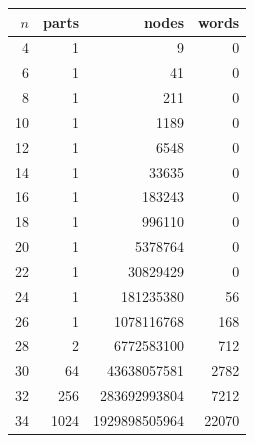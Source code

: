 \begin{tabular}{rrrr}
\toprule
$n$ & parts & nodes & words \\
\midrule
4 & 1 & \num{9} & \num{0} \\
6 & 1 & \num{41} & \num{0} \\
8 & 1 & \num{211} & \num{0} \\
10 & 1 & \num{1189} & \num{0} \\
12 & 1 & \num{6548} & \num{0} \\
14 & 1 & \num{33635} & \num{0} \\
16 & 1 & \num{183243} & \num{0} \\
18 & 1 & \num{996110} & \num{0} \\
20 & 1 & \num{5378764} & \num{0} \\
22 & 1 & \num{30829429} & \num{0} \\
24 & 1 & \num{181235380} & \num{56} \\
26 & 1 & \num{1078116768} & \num{168} \\
28 & 2 & \num{6772583100} & \num{712} \\
30 & 64 & \num{43638057581} & \num{2782} \\
32 & 256 & \num{283692993804} & \num{7212} \\
34 & 1024 & \num{1929898505964} & \num{22070} \\
\bottomrule
\end{tabular}
